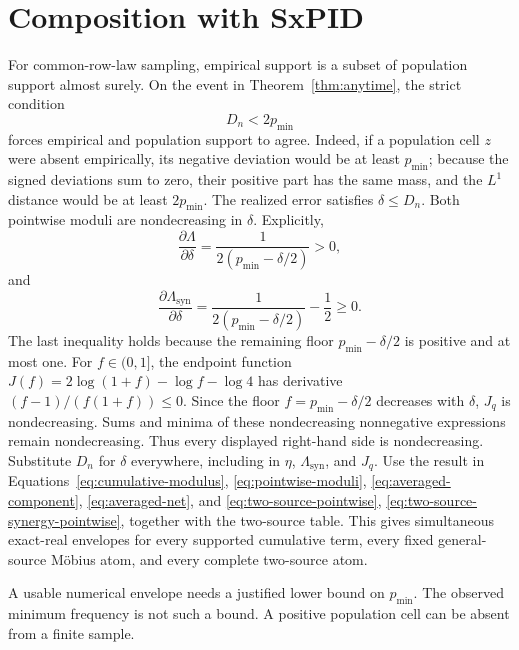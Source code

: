 \documentclass[11pt]{article}
\theoremstyle{definition}
\begin{document}
\section{Composition with SxPID}

	For common-row-law sampling, empirical support is a subset of population support almost surely.  On
	the event in Theorem~\ref{thm:anytime}, the strict condition
\begin{equation}
  D_n<2p_{\min}
	\end{equation}
	forces empirical and population support to agree.  Indeed, if a population cell $z$ were absent
	empirically, its negative deviation would be at least $p_{\min}$; because the signed deviations
	sum to zero, their positive part has the same mass, and the $L^1$ distance would be at least
	$2p_{\min}$.  The realized error satisfies $\delta\le D_n$.
	Both pointwise moduli are nondecreasing in $\delta$.  Explicitly,
	\begin{equation}
	  \frac{\partial\Lambda}{\partial\delta}
	  =
	  \frac1{2(p_{\min}-\delta/2)}
	  >0,
	\end{equation}
	and
	\begin{equation}
	  \frac{\partial\Lambda_{\mathrm{syn}}}{\partial\delta}
  =
	  \frac1{2(p_{\min}-\delta/2)}-\frac12
	  \ge0.
	\end{equation}
	The last inequality holds because the remaining floor
	$p_{\min}-\delta/2$ is positive and at most one.
	For $f\in(0,1]$, the endpoint function
	$J(f)=2\log(1+f)-\log f-\log4$ has derivative
	$(f-1)/(f(1+f))\le0$.  Since the floor $f=p_{\min}-\delta/2$ decreases with $\delta$, $J_q$ is
	nondecreasing.  Sums and minima of these nondecreasing nonnegative expressions remain
	nondecreasing.  Thus every displayed right-hand side is nondecreasing.  Substitute $D_n$ for
	$\delta$ everywhere,
including in $\eta$, $\Lambda_{\mathrm{syn}}$, and $J_q$.  Use the result in
Equations~\eqref{eq:cumulative-modulus}, \eqref{eq:pointwise-moduli},
\eqref{eq:averaged-component}, \eqref{eq:averaged-net}, and
\eqref{eq:two-source-pointwise}, \eqref{eq:two-source-synergy-pointwise}, together with the
two-source table.  This gives simultaneous
exact-real envelopes for every supported cumulative term, every fixed general-source M{\"o}bius
atom, and every complete two-source atom.

A usable numerical envelope needs a justified lower bound on $p_{\min}$.  The observed minimum
frequency is not such a bound.  A positive population cell can be absent from a finite sample.
\end{document}
